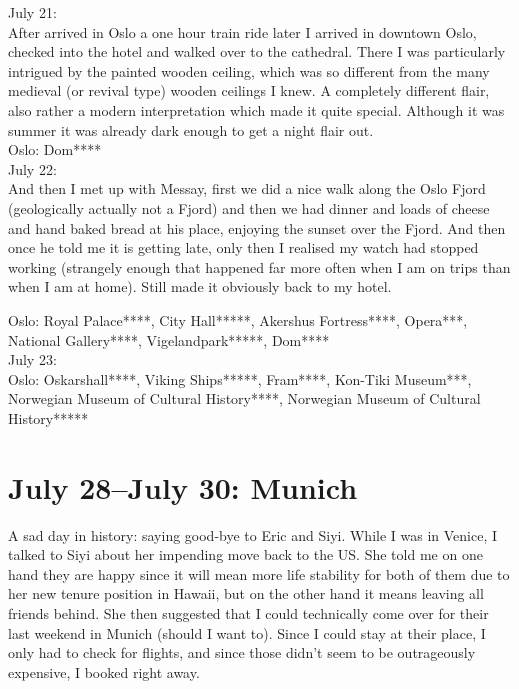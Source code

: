 July 21:\\
After arrived in Oslo a one hour train ride later I arrived in downtown Oslo, checked into the hotel and walked over to the cathedral. There I was particularly intrigued by the painted wooden ceiling, which was so different from the many medieval (or revival type) wooden ceilings I knew. A completely different flair, also rather a modern interpretation which made it quite special. Although it was summer it was already dark enough to get a night flair out.\\

Oslo: Dom****\\

July 22:\\

And then I met up with Messay, first we did a nice walk along the Oslo Fjord (geologically actually not a Fjord) and then we had dinner and loads of cheese and hand baked bread at his place, enjoying the sunset over the Fjord. And then once he told me it is getting late, only then I realised my watch had stopped working (strangely enough that happened far more often when I am on trips than when I am at home).  Still made it obviously back to my hotel.

Oslo: Royal Palace****, City Hall*****, Akershus Fortress****, Opera***, National Gallery****, Vigelandpark*****, Dom****\\

July 23:\\
Oslo: Oskarshall****, Viking Ships*****, Fram****, Kon-Tiki Museum***, Norwegian Museum of Cultural History****, Norwegian Museum of Cultural History*****

\section{July 28--July 30: Munich}
\label{Munich2017}

A sad day in history: saying good-bye to Eric and Siyi. While I was in Venice, I talked to Siyi about her impending move back to the US. She told me on one hand they are happy since it will mean more life stability for both of them due to her new tenure position in Hawaii, but on the other hand it means leaving all friends behind. She then suggested that I could technically come over for their last weekend in Munich (should I want to). Since I could stay at their place, I only had to check for flights, and since those didn't seem to be outrageously expensive, I booked right away.\\

